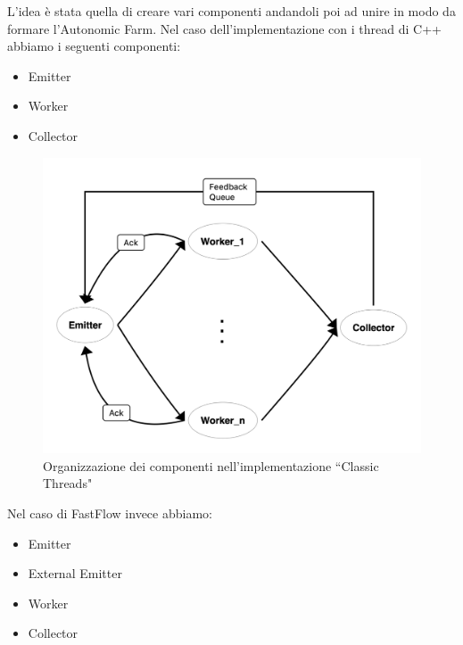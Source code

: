 \documentclass[12pt]{report}
\begin{document}
L'idea è stata quella di creare vari componenti andandoli poi ad unire in modo da formare l'Autonomic Farm.
Nel caso dell'implementazione con i thread di C++ abbiamo i seguenti componenti:

\begin{itemize}
\item Emitter
\item Worker
\item Collector
\end{itemize}

\begin{figure}[H]
\centering
  \includegraphics[width=0.7\linewidth]{ClassicThreads.png}
  \caption{Organizzazione dei componenti nell'implementazione ``Classic Threads"}
  \label{}
\end{figure}



Nel caso di FastFlow invece abbiamo:
\begin{itemize}
\item Emitter
\item External Emitter
\item Worker
\item Collector
\end{itemize}
\end{document}
